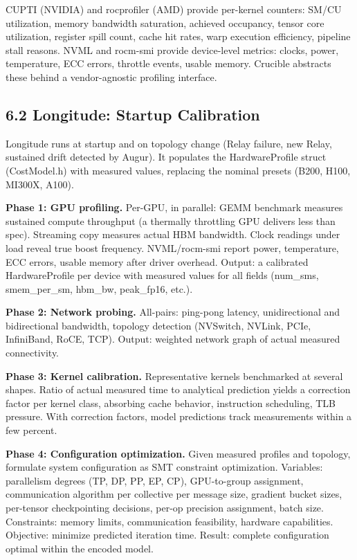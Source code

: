 CUPTI (NVIDIA) and rocprofiler (AMD) provide per-kernel counters: SM/CU utilization, memory bandwidth saturation, achieved occupancy, tensor core utilization, register spill count, cache hit rates, warp execution efficiency, pipeline stall reasons. NVML and rocm-smi provide device-level metrics: clocks, power, temperature, ECC errors, throttle events, usable memory. Crucible abstracts these behind a vendor-agnostic profiling interface.

\subsection{6.2 Longitude: Startup Calibration}\label{longitude-startup-calibration}

Longitude runs at startup and on topology change (Relay failure, new Relay, sustained drift detected by Augur). It populates the HardwareProfile struct (CostModel.h) with measured values, replacing the nominal presets (B200, H100, MI300X, A100).

\textbf{Phase 1: GPU profiling.} Per-GPU, in parallel: GEMM benchmark measures sustained compute throughput (a thermally throttling GPU delivers less than spec). Streaming copy measures actual HBM bandwidth. Clock readings under load reveal true boost frequency. NVML/rocm-smi report power, temperature, ECC errors, usable memory after driver overhead. Output: a calibrated HardwareProfile per device with measured values for all fields (num\_sms, smem\_per\_sm, hbm\_bw, peak\_fp16, etc.).

\textbf{Phase 2: Network probing.} All-pairs: ping-pong latency, unidirectional and bidirectional bandwidth, topology detection (NVSwitch, NVLink, PCIe, InfiniBand, RoCE, TCP). Output: weighted network graph of actual measured connectivity.

\textbf{Phase 3: Kernel calibration.} Representative kernels benchmarked at several shapes. Ratio of actual measured time to analytical prediction yields a correction factor per kernel class, absorbing cache behavior, instruction scheduling, TLB pressure. With correction factors, model predictions track measurements within a few percent.

\textbf{Phase 4: Configuration optimization.} Given measured profiles and topology, formulate system configuration as SMT constraint optimization. Variables: parallelism degrees (TP, DP, PP, EP, CP), GPU-to-group assignment, communication algorithm per collective per message size, gradient bucket sizes, per-tensor checkpointing decisions, per-op precision assignment, batch size. Constraints: memory limits, communication feasibility, hardware capabilities. Objective: minimize predicted iteration time. Result: complete configuration optimal within the encoded model.

